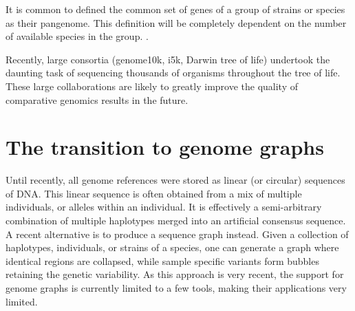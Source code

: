 It is common to defined the common set of genes of a group of strains or species as their pangenome. This definition will be completely dependent on the number of available species in the group. .

Recently, large consortia (genome10k, i5k, Darwin tree of life) undertook the daunting task of sequencing thousands of organisms throughout the tree of life. These large collaborations are likely to greatly improve the quality of comparative genomics results in the future.

\section{The transition to genome graphs}

Until recently, all genome references were stored as linear (or circular) sequences of DNA. This linear sequence is often obtained from a mix of multiple individuals, or alleles within an individual. It is effectively a semi-arbitrary combination of multiple haplotypes merged into an artificial consensus sequence. A recent alternative is to produce a sequence graph instead. Given a collection of haplotypes, individuals, or strains of a species, one can generate a graph where identical regions are collapsed, while sample specific variants form bubbles retaining the genetic variability. As this approach is very recent, the support for genome graphs is currently limited to a few tools, making their applications very limited.
